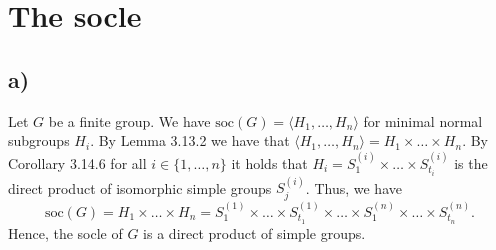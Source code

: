 \section{The socle}
\subsection*{a)}
Let $G$ be a finite group. We have $\text{soc}(G) = \langle H_1,\dots,H_n \rangle$ for minimal normal subgroups $H_i$. By Lemma 3.13.2 we have that $\langle H_1,\dots,H_n \rangle = H_1 \times \dots \times H_n$. By Corollary 3.14.6 for all $i \in \{1,\dots,n\}$ it holds that $H_i = S_1^{(i)} \times \dots \times S_{t_i}^{(i)}$ is the direct product of isomorphic simple groups $S_j^{(i)}$. Thus, we have
\[ \text{soc}(G) =  H_1 \times \dots \times H_n = S_1^{(1)} \times \dots \times S_{t_1}^{(1)} \times \dots \times S_1^{(n)} \times \dots \times S_{t_n}^{(n)}. \]
Hence, the socle of $G$ is a direct product of simple groups.